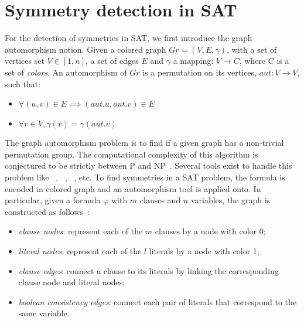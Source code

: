 \section{Symmetry detection in SAT}
For the detection of symmetries in SAT, we first introduce the graph automorphism notion.
Given a colored graph $Gr = (V, E, \gamma)$, with a set of vertices set $V \in  [1, n] $, a set of edges $E$ and
$\gamma$ a mapping: $V \rightarrow C$, where C is a set of \emph{colors}.
An automorphism of $Gr$ is a permutation on its vertices, $aut :V \rightarrow V$,
such that:
\begin{itemize}
 \item $\forall (u, v) \in E \implies (aut.u, aut.v) \in E$
 \item $\forall v \in V, \gamma(v) = \gamma(aut.v)$
\end{itemize}
The graph automorphism problem is to find if a given graph has a non-trivial permutation group. 
The computational complexity of this algorithm is conjectured to be strictly between P and NP~\cite{kobler2012graph,toran2004hardness}.
Several tools exist to handle this problem like \saucy~\cite{katebi2010symmetry},
\bliss~\cite{JunttilaKaski:ALENEX2007}, \nauty~\cite{mckay2003nauty}, etc.
%
To find symmetries in a SAT problem, the formula is encoded in colored graph
and an automorphism tool is applied onto. In particular, given a formula $\varphi$ with
$m$ clauses and $n$ variables, the graph is constructed as follows~\cite{biere2009handbook}:
\begin{itemize}
 \item \emph{clause nodes}: represent each of the $m$ clauses by a node with color 0;
 \item \emph{literal nodes}: represent each of the $l$ literals by a node with color 1;
 \item \emph{clause edges}: connect a clause to its literals by linking the corresponding  clause node and literal nodes;
 \item \emph{boolean consistency edges}: connect each pair of literals that correspond to the same variable.
\end{itemize}
